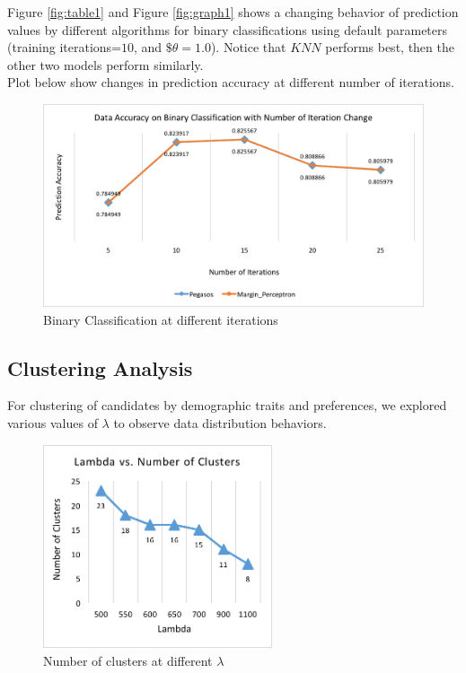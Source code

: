 \documentclass[11pt,letterpaper]{article}
\begin{document}
Figure \ref{fig:table1} and Figure \ref{fig:graph1} shows a changing behavior of prediction values by different algorithms for binary classifications using default parameters (training iterations=$10$, and $\$\theta=1.0$). Notice that $KNN$ performs best, then the other two models perform similarly.\\

Plot below show changes in prediction accuracy at different number of iterations.

\begin{figure}
  \includegraphics[width=\linewidth]{Normal_Prediction_Accuracy_with_Interation.png}
  \caption{Binary Classification at different iterations}
  \label{fig:table2}
\end{figure}

\pagebreak

\subsection{Clustering Analysis}

For clustering of candidates by demographic traits and preferences, we explored various values of $\lambda$ to observe data distribution behaviors.

\begin{figure}
  \includegraphics[width=\linewidth,height=6cm]{2_lamba_vs_cluster.png}
  \caption{Number of clusters at different $\lambda$}
  \label{fig:graph2}
\end{figure}
\end{document}
